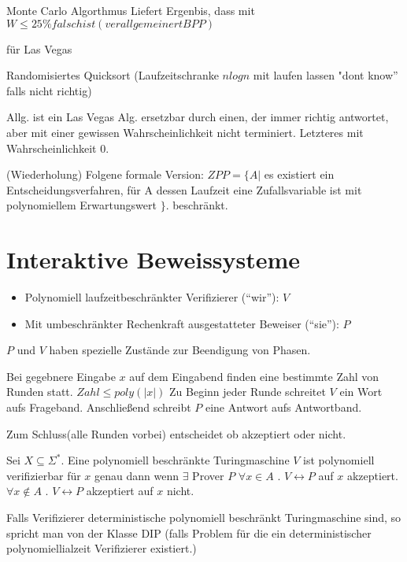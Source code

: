 Monte Carlo Algorthmus Liefert Ergenbis, dass mit $W \leq 25\% falsch ist (verallgemeinert BPP)$

\begin{beispiel}
für Las Vegas

Randomisiertes Quicksort (Laufzeitschranke $n log n$ mit laufen lassen
"dont know'' falls nicht richtig)
\end{beispiel}

Allg. ist ein Las Vegas Alg. ersetzbar durch einen, der immer richtig
antwortet, aber mit einer gewissen Wahrscheinlichkeit nicht
terminiert. Letzteres mit Wahrscheinlichkeit $0$.

(Wiederholung)
Folgene formale Version:
$ZPP = \{A |$ es existiert ein Entscheidungsverfahren, für A dessen Laufzeit eine Zufallsvariable ist mit polynomiellem Erwartungswert $\}$. beschränkt.      

\section{Interaktive Beweissysteme} 
\begin{itemize}
\item Polynomiell laufzeitbeschränkter Verifizierer (``wir''): $V$
\item Mit umbeschränkter Rechenkraft ausgestatteter Beweiser (``sie''): $P$
\end{itemize}


$P$ und $V$ haben spezielle Zustände zur Beendigung von Phasen.

Bei gegebnere Eingabe $x$ auf dem Eingabend finden eine bestimmte Zahl von Runden statt.
$Zahl \leq poly (|x|)$
Zu Beginn jeder Runde schreitet $V$ ein Wort aufs Frageband. Anschließend schreibt $P$ eine Antwort aufs Antwortband.

Zum Schluss(alle Runden vorbei) entscheidet ob akzeptiert oder nicht.

\begin{definition}
Sei $X \subseteq \Sigma^*$. Eine polynomiell beschränkte Turingmaschine $V$ ist polynomiell verifizierbar für $x$
genau dann wenn $ \exists$ Prover $P$
$\forall x \in A$ . $V \leftrightarrow P$ auf $x$ akzeptiert. $\forall x \notin A$ . $V \leftrightarrow P$   akzeptiert auf $x$ nicht.

Falls Verifizierer deterministische polynomiell beschränkt
Turingmaschine sind, so spricht man von der Klasse DIP (falls Problem für
die ein deterministischer polynomiellialzeit Verifizierer existiert.)
\end{definition}

